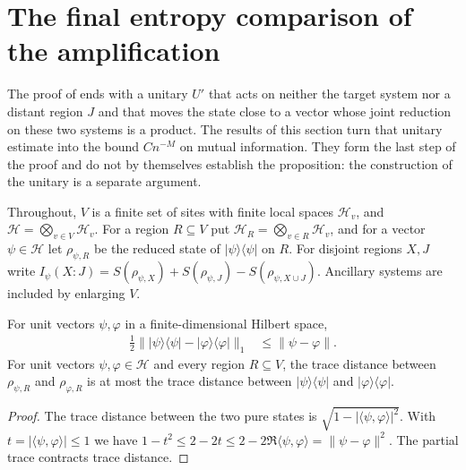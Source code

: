 
\section{The final entropy comparison of the amplification}

The proof of \cite[Proposition~10.2]{OpenAI2026AreaLaw} ends with a unitary
$U'$ that acts on neither the target system nor a distant region $J$ and that
moves the state close to a vector whose joint reduction on these two systems
is a product. The results of this section turn that unitary estimate into the
bound $C n^{-M}$ on mutual information. They form the last step of the proof
and do not by themselves establish the proposition: the construction of the
unitary is a separate argument.

Throughout, $V$ is a finite set of sites with finite local spaces
$\mathcal H_v$, and $\mathcal H=\bigotimes_{v\in V}\mathcal H_v$. For a region
$R\subseteq V$ put $\mathcal H_R=\bigotimes_{v\in R}\mathcal H_v$, and for a
vector $\psi\in\mathcal H$ let $\rho_{\psi,R}$ be the reduced state of
$|\psi\rangle\langle\psi|$ on $R$. For disjoint regions $X,J$ write
$I_\psi(X:J)=S(\rho_{\psi,X})+S(\rho_{\psi,J})-S(\rho_{\psi,X\cup J})$.
Ancillary systems are included by enlarging $V$.

\begin{lemma}
    \label{lem:al_amp_pure_trace_distance}
    \leanok
    For unit vectors $\psi,\varphi$ in a finite-dimensional Hilbert space,
    \begin{align*}
        \tfrac12\bigl\||\psi\rangle\langle\psi|
        -|\varphi\rangle\langle\varphi|\bigr\|_1 & \le\|\psi-\varphi\|.
    \end{align*}
    For unit vectors $\psi,\varphi\in\mathcal H$ and every region
    $R\subseteq V$, the trace distance between $\rho_{\psi,R}$ and
    $\rho_{\varphi,R}$ is at most the trace distance between
    $|\psi\rangle\langle\psi|$ and $|\varphi\rangle\langle\varphi|$.
\end{lemma}
\begin{proof}\leanok
    The trace distance between the two pure states is
    $\sqrt{1-|\langle\psi,\varphi\rangle|^2}$. With
    $t=|\langle\psi,\varphi\rangle|\le1$ we have
    $1-t^2\le2-2t\le2-2\Re\langle\psi,\varphi\rangle
        =\|\psi-\varphi\|^2$.
    The partial trace contracts trace distance.
\end{proof}

